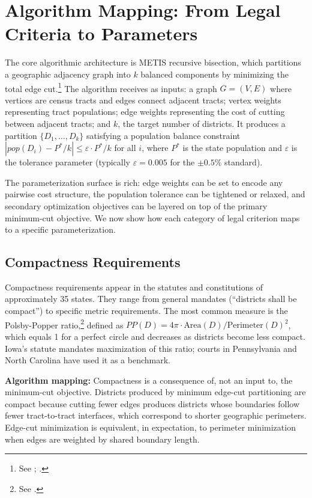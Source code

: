 \section{Algorithm Mapping: From Legal Criteria to Parameters}
\label{sec:algorithm}

The core algorithmic architecture is METIS recursive bisection, which partitions a geographic adjacency graph into $k$ balanced components by minimizing the total edge cut.\footnote{See \citet{karypis1998fast}; \citet{dellaLibera2026recursive}.} The algorithm receives as inputs: a graph $G = (V, E)$ where vertices are census tracts and edges connect adjacent tracts; vertex weights representing tract populations; edge weights representing the cost of cutting between adjacent tracts; and $k$, the target number of districts. It produces a partition $\{D_1, \ldots, D_k\}$ satisfying a population balance constraint $|pop(D_i) - P^*/k| \le \varepsilon \cdot P^*/k$ for all $i$, where $P^*$ is the state population and $\varepsilon$ is the tolerance parameter (typically $\varepsilon = 0.005$ for the $\pm 0.5\%$ standard).

The parameterization surface is rich: edge weights can be set to encode any pairwise cost structure, the population tolerance can be tightened or relaxed, and secondary optimization objectives can be layered on top of the primary minimum-cut objective. We now show how each category of legal criterion maps to a specific parameterization.

\subsection{Compactness Requirements}

Compactness requirements appear in the statutes and constitutions of approximately 35 states. They range from general mandates (``districts shall be compact'') to specific metric requirements. The most common measure is the Polsby-Popper ratio,\footnote{See \citet{polsby1991third}.} defined as $PP(D) = 4\pi \cdot \text{Area}(D) / \text{Perimeter}(D)^2$, which equals 1 for a perfect circle and decreases as districts become less compact. Iowa's statute mandates maximization of this ratio; courts in Pennsylvania and North Carolina have used it as a benchmark.

\textbf{Algorithm mapping:} Compactness is a consequence of, not an input to, the minimum-cut objective. Districts produced by minimum edge-cut partitioning are compact because cutting fewer edges produces districts whose boundaries follow fewer tract-to-tract interfaces, which correspond to shorter geographic perimeters. Edge-cut minimization is equivalent, in expectation, to perimeter minimization when edges are weighted by shared boundary length.


